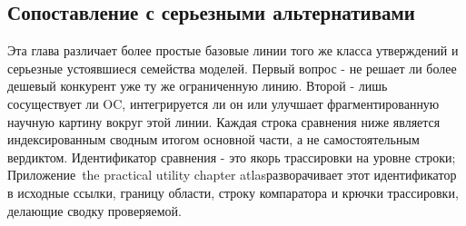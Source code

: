 \subsection{Сопоставление с серьезными альтернативами}
Эта глава различает более простые базовые линии того же класса утверждений и серьезные устоявшиеся семейства моделей. Первый вопрос - не решает ли более дешевый конкурент уже ту же ограниченную линию. Второй - лишь сосуществует ли OC, интегрируется ли он или улучшает фрагментированную научную картину вокруг этой линии.
Каждая строка сравнения ниже является индексированным сводным итогом основной части, а не самостоятельным вердиктом. Идентификатор сравнения - это якорь трассировки на уровне строки; Приложение~the practical utility chapter atlasразворачивает этот идентификатор в исходные ссылки, границу области, строку компаратора и крючки трассировки, делающие сводку проверяемой.

